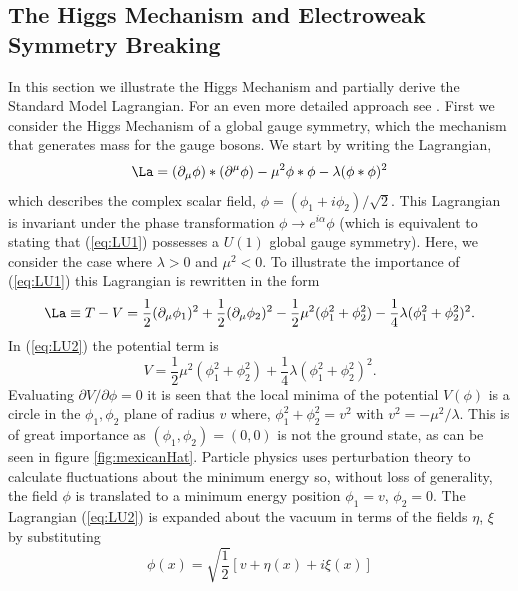 \subsection{The Higgs Mechanism and Electroweak Symmetry Breaking}
In this section we illustrate the Higgs Mechanism and partially derive the
Standard Model Lagrangian. For an even more detailed approach see .%
First we consider the Higgs Mechanism of a global gauge symmetry, 
which the mechanism that generates mass for the gauge bosons. 
We start by writing the Lagrangian, 
\begin{equation}
\La=(\partial_{\mu}\phi)*(\partial^{\mu}\phi) - \mu^{2}\phi*\phi - \lambda (\phi*\phi)^{2}
\label{eq:LU1}
\end{equation}
which describes the complex scalar field, $\phi=(\phi_{1}+i\phi_{2})/\sqrt{2}$.
This Lagrangian is invariant under the phase transformation $\phi\rightarrow e^{i\alpha}\phi$
(which is equivalent to stating that (\ref{eq:LU1}) possesses a $U(1)$ global gauge symmetry).
Here, we consider the case where $\lambda>0$ and $\mu^{2}<0$. To illustrate the importance of (\ref{eq:LU1})
this Lagrangian is rewritten in the form
\begin{equation}
\La \equiv T-V = \frac{1}{2}(\partial_{\mu}\phi_{1})^{2}+\frac{1}{2}(\partial_{\mu}\phi_{2})^{2}-\frac{1}{2}\mu^{2}(\phi_{1}^{2}+\phi_{2}^{2})-\frac{1}{4}\lambda(\phi_{1}^{2}+\phi_{2}^{2})^{2}.
\label{eq:LU2}
\end{equation}
In (\ref{eq:LU2}) the potential term is
\begin{equation}
V=\frac{1}{2}\mu^{2}(\phi_{1}^{2}+\phi_{2}^{2})+\frac{1}{4}\lambda(\phi_{1}^{2}+\phi_{2}^{2})^{2}.
\end{equation}
Evaluating $\partial V/ \partial \phi = 0$ it is seen that the local minima
of the potential $V(\phi)$ is a circle in the $\phi_{1},\phi_{2}$ plane of radius $v$ where,
$\phi_{1}^{2}+\phi_{2}^{2}=v^{2}$ with $v^{2}= - \mu^{2}/\lambda$. This 
is of great importance as $(\phi_{1},\phi_{2})=(0,0)$ is not the ground state, as can be seen in figure \ref{fig:mexicanHat}.
Particle physics uses perturbation theory to calculate fluctuations 
about the minimum energy so, without loss of generality, the field $\phi$ is translated to a minimum
energy position $\phi_{1}=v$, $\phi_{2}=0$. The Lagrangian (\ref{eq:LU2}) is
expanded about the vacuum in terms of the fields $\eta$, $\xi$ by substituting
\begin{equation}
\phi(x)=\sqrt{\frac{1}{2}}[v+\eta(x)+i\xi(x)]
\label{eq:VTerms}
\end{equation}
